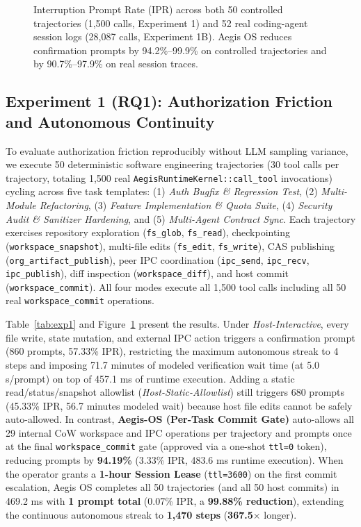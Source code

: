 \documentclass[10pt,twocolumn]{article}
\begin{document}
\begin{figure}[!t]
{\begin{tikzpicture}[font=\sffamily\scriptsize]
\end{tikzpicture}%
}
\caption{Interruption Prompt Rate (IPR) across both 50 controlled trajectories (1,500 calls, Experiment 1) and 52 real coding-agent session logs (28,087 calls, Experiment 1B). Aegis OS reduces confirmation prompts by 94.2\%--99.9\% on controlled trajectories and by 90.7\%--97.9\% on real session traces.}
\label{fig:exp1}
\end{figure}

\subsection{Experiment 1 (RQ1): Authorization Friction and Autonomous Continuity}

To evaluate authorization friction reproducibly without LLM sampling variance, we execute 50 deterministic software engineering trajectories (30 tool calls per trajectory, totaling 1,500 real \texttt{AegisRuntimeKernel::call\_tool} invocations) cycling across five task templates: (1) \emph{Auth Bugfix \& Regression Test}, (2) \emph{Multi-Module Refactoring}, (3) \emph{Feature Implementation \& Quota Suite}, (4) \emph{Security Audit \& Sanitizer Hardening}, and (5) \emph{Multi-Agent Contract Sync}. Each trajectory exercises repository exploration (\texttt{fs\_glob}, \texttt{fs\_read}), checkpointing (\texttt{workspace\_snapshot}), multi-file edits (\texttt{fs\_edit}, \texttt{fs\_write}), CAS publishing (\texttt{org\_artifact\_publish}), peer IPC coordination (\texttt{ipc\_send}, \texttt{ipc\_recv}, \texttt{ipc\_publish}), diff inspection (\texttt{workspace\_diff}), and host commit (\texttt{workspace\_commit}). All four modes execute all 1,500 tool calls including all 50 real \texttt{workspace\_commit} operations.

Table~\ref{tab:exp1} and Figure~\ref{fig:exp1} present the results. Under \emph{Host-Interactive}, every file write, state mutation, and external IPC action triggers a confirmation prompt (860 prompts, 57.33\% IPR), restricting the maximum autonomous streak to 4 steps and imposing 71.7 minutes of modeled verification wait time (at 5.0 s/prompt) on top of 457.1 ms of runtime execution. Adding a static read/status/snapshot allowlist (\emph{Host-Static-Allowlist}) still triggers 680 prompts (45.33\% IPR, 56.7 minutes modeled wait) because host file edits cannot be safely auto-allowed. In contrast, \textbf{Aegis-OS (Per-Task Commit Gate)} auto-allows all 29 internal CoW workspace and IPC operations per trajectory and prompts once at the final \texttt{workspace\_commit} gate (approved via a one-shot \texttt{ttl=0} token), reducing prompts by \textbf{94.19\%} (3.33\% IPR, 483.6 ms runtime execution). When the operator grants a \textbf{1-hour Session Lease} (\texttt{ttl=3600}) on the first commit escalation, Aegis OS completes all 50 trajectories (and all 50 host commits) in 469.2 ms with \textbf{1 prompt total} (0.07\% IPR, a \textbf{99.88\% reduction}), extending the continuous autonomous streak to \textbf{1,470 steps} (\textbf{367.5$\times$} longer).
\end{document}
